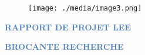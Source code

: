 \documentclass[12pt]{report}
\begin{document}
\vspace{\baselineskip}
\setlength{\parskip}{0.0pt}



\begin{figure}[H]
\advance\leftskip 3.98in
\begin{center}
    
\texttt{[image: ./media/image3.png]}
\end{center}
\end{figure}



\par




\vspace{\baselineskip}

\vspace{\baselineskip}
\setlength{\parskip}{9.96pt}

\vspace{\baselineskip}

\vspace{\baselineskip}

\vspace{\baselineskip}
\setlength{\parskip}{0.0pt}
\begin{Center}
 {\fontsize{28pt}{33.6pt}\selectfont \textbf{\textcolor[HTML]{4F81BD}{RAPPORT DE PROJET LEE}}\par}
\end{Center}\par


\par


\vspace{\baselineskip}
\setlength{\parskip}{9.96pt}
\setlength{\parskip}{0.0pt}
\begin{Center}
\textcolor[HTML]{4F81BD}{ }{\fontsize{28pt}{33.6pt}\selectfont \textbf{\textcolor[HTML]{4F81BD}{BROCANTE RECHERCHE}}\par}
\end{Center}\par


\vspace{\baselineskip}
\setlength{\parskip}{9.96pt}

\vspace{\baselineskip}

\vspace{\baselineskip}
\end{document}
